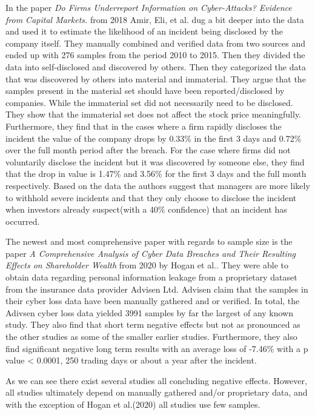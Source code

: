 In the paper \textit{Do Firms Underreport Information on Cyber-Attacks? Evidence from Capital Markets.}\cite{amir2018firms} from 2018 Amir, Eli, et al. dug a bit deeper into the data and used it to estimate the likelihood of an incident being disclosed by the company itself. They manually combined and verified data from two sources and ended up with 276 samples from the period 2010 to 2015. Then they divided the data into self-disclosed and discovered by others. Then they categorized the data that was discovered by others into material and immaterial. They argue that the samples present in the material set should have been reported/disclosed by companies. While the immaterial set did not necessarily need to be disclosed. They show that the immaterial set does not affect the stock price meaningfully. Furthermore, they find that in the cases where a firm rapidly discloses the incident the value of the company drops by 0.33\% in the first 3 days and 0.72\% over the full month period after the breach. For the case where firms did not voluntarily disclose the incident but it was discovered by someone else, they find that the drop in value is 1.47\% and 3.56\% for the first 3 days and the full month respectively. Based on the data the authors suggest that managers are more likely to withhold severe incidents and that they only choose to disclose the incident when investors already suspect(with a 40\% confidence) that an incident has occurred. 

The newest and most comprehensive paper with regards to sample size is the paper \textit{A Comprehensive Analysis of Cyber Data Breaches and Their Resulting Effects on Shareholder Wealth} from 2020 by Hogan et al.\cite{hogan2020comprehensive}. They were able to obtain data regarding personal information leakage from a proprietary dataset from the insurance data provider Advisen Ltd. Advisen claim that the samples in their cyber loss data have been manually gathered and or verified. In total, the Adivsen cyber loss data yielded 3991 samples by far the largest of any known study. They also find that short term negative effects but not as pronounced as the other studies as some of the smaller earlier studies. Furthermore, they also find significant negative long term results with an average loss of -7.46\% with a p value < 0.0001, 250 trading days or about a year after the incident.

As we can see there exist several studies all concluding negative effects. However, all studies ultimately depend on manually gathered and/or proprietary data, and with the exception of Hogan et al.(2020) all studies use few samples.
